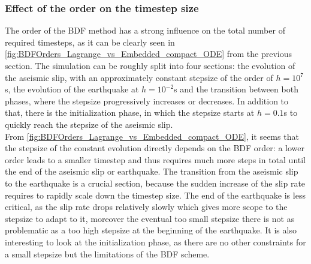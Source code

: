 \subsubsection{Effect of the order on the timestep size}
The order of the BDF method has a strong influence on the total number of required timesteps, as it can be clearly seen in \autoref{fig:BDFOrders_Lagrange_vs_Embedded_compact_ODE} from the previous section. The simulation can be roughly split into four sections: the evolution of the aseismic slip, with an approximately constant stepsize of the order of $h=10^7$s, the evolution of the earthquake at $h=10^{-2}$s and the transition between both phases, where the stepsize progressively increases or decreases. In addition to that, there is the initialization phase, in which the stepsize starts at $h=0.1$s to quickly reach the stepsize of the aseismic slip. \\
From \autoref{fig:BDFOrders_Lagrange_vs_Embedded_compact_ODE}, it seems that the stepsize of the constant evolution directly depends on the BDF order: a lower order leads to a smaller timestep and thus requires much more steps in total until the end of the aseismic slip or earthquake. The transition from the aseismic slip to the earthquake is a crucial section, because the sudden increase of the slip rate requires to rapidly scale down the timestep size. The end of the earthquake is less critical, as the slip rate drops relatively slowly which gives more scope to the stepsize to adapt to it, moreover the eventual too small stepsize there is not as problematic as a too high stepsize at the beginning of the earthquake. It is also interesting to look at the initialization phase, as there are no other constraints for a small stepsize but the limitations of the BDF scheme. \\
